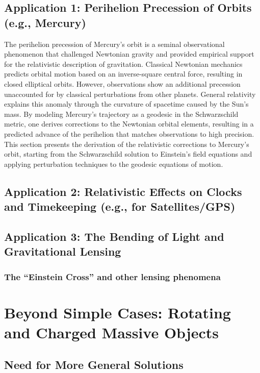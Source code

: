 \documentclass{amsart}
\theoremstyle{definition}
\theoremstyle{remark}
\begin{document}
\subsection{Application 1: Perihelion Precession of Orbits (e.g., Mercury)}
\label{subsec:mercury_precession}
The perihelion precession of Mercury’s orbit is a seminal observational phenomenon that challenged Newtonian gravity and provided empirical support for the relativistic description of gravitation.
Classical Newtonian mechanics predicts orbital motion based on an inverse-square central force, resulting in closed elliptical orbits.
However, observations show an additional precession unaccounted for by classical perturbations from other planets.
General relativity explains this anomaly through the curvature of spacetime caused by the Sun’s mass.
By modeling Mercury’s trajectory as a geodesic in the Schwarzschild metric, one derives corrections to the Newtonian orbital elements, resulting in a predicted advance of the perihelion that matches observations to high precision.
This section presents the derivation of the relativistic corrections to Mercury’s orbit, starting from the Schwarzschild solution to Einstein’s field equations and applying perturbation techniques to the geodesic equations of motion.

\subsection{Application 2: Relativistic Effects on Clocks and Timekeeping (e.g., for Satellites/GPS)}

\subsection{Application 3: The Bending of Light and Gravitational Lensing}
\subsubsection{The ``Einstein Cross'' and other lensing phenomena}

\section{Beyond Simple Cases: Rotating and Charged Massive Objects}
\label{sec:kerr_etc}

\subsection{Need for More General Solutions}
\end{document}
